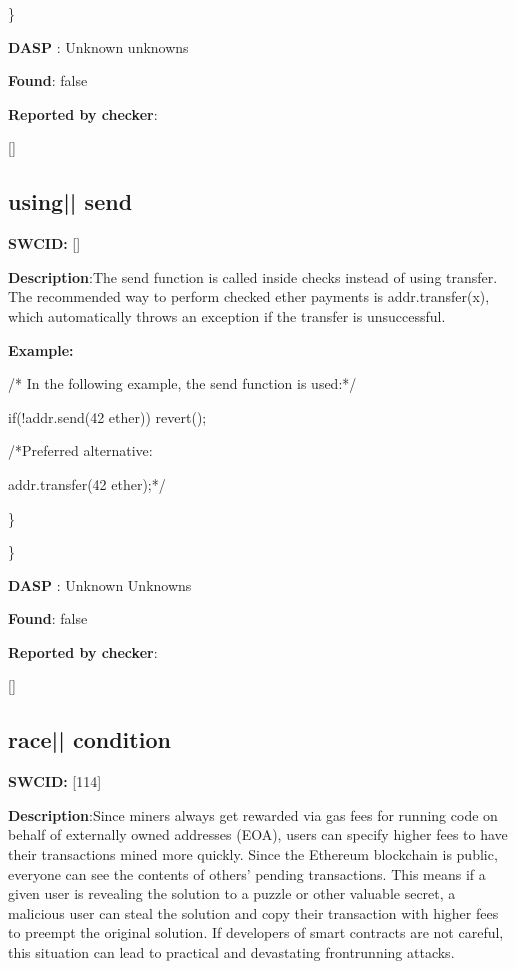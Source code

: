 \documentclass{article}
\begin{document}
\} 

\textbf{DASP} : Unknown unknowns

\textbf{Found}: false

\textbf{Reported by checker}: 
\begin{ffcode} 

[]
\end{ffcode} 
\subsection{using{|\textunderscore| }send} 
\textbf{SWC{\textunderscore }ID:} []

\textbf{Description}:The send function is called inside checks instead of using transfer. The recommended way to perform checked ether payments is addr.transfer(x), which automatically throws an exception if the transfer is unsuccessful.


\textbf{Example:} 
\begin{ffcode} 

/* In the following example, the send function is used:*/ 


if(!addr.send(42 ether)) {
    revert();
}

 /*Preferred alternative:

addr.transfer(42 ether);*/ 

\end{ffcode} 
\} 

\} 

\textbf{DASP} : Unknown Unknowns

\textbf{Found}: false

\textbf{Reported by checker}: 
\begin{ffcode} 

[]
\end{ffcode} 
\subsection{race{|\textunderscore| }condition} 
\textbf{SWC{\textunderscore }ID:} [114]

\textbf{Description}:Since miners always get rewarded via gas fees for running code on behalf of externally owned addresses (EOA), users can specify higher fees to have their transactions mined more quickly. Since the Ethereum blockchain is public, everyone can see the contents of others' pending transactions. This means if a given user is revealing the solution to a puzzle or other valuable secret, a malicious user can steal the solution and copy their transaction with higher fees to preempt the original solution. If developers of smart contracts are not careful, this situation can lead to practical and devastating front{\textendash}running attacks.
\end{document}
